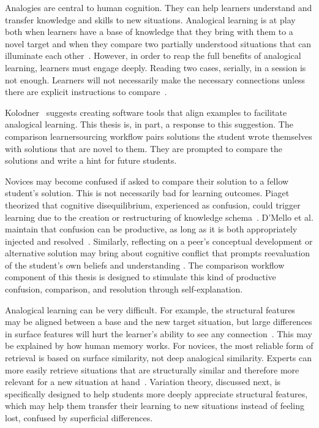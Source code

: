 Analogies are central to human cognition. They can help learners understand and transfer knowledge and skills to new situations. Analogical learning is at play both when learners have a base of knowledge that they bring with them to a novel target and when they compare two partially understood situations that can illuminate each other~\cite{kurtz01learning,loewenstein2003analogical}. However, in order to reap the full benefits of analogical learning, learners must engage deeply. Reading two cases, serially, in a session is not enough. Learners will not necessarily make the necessary connections unless there are explicit instructions to compare~\cite{loewenstein2003analogical,catrambone1989overcoming}. 

Kolodner~\cite{Kolodner} suggests creating software tools that align examples to facilitate analogical learning. This thesis is, in part, a response to this suggestion. The comparison learnersourcing workflow pairs solutions the student wrote themselves with solutions that are novel to them. They are prompted to compare the solutions and write a hint for future students.

Novices may become confused if asked to compare their solution to a fellow student's solution. This is not necessarily bad for learning outcomes. Piaget theorized that cognitive disequilibrium, experienced as confusion, could trigger learning due to the creation or restructuring of knowledge schema~\cite{disequilibrium}. D'Mello et al. maintain that confusion can be productive, as long as it is both appropriately injected and resolved~\cite{productiveconfusion}. Similarly, reflecting on a peer's conceptual development or alternative solution may bring about cognitive conflict that prompts reevaluation of the student's own beliefs and understanding \cite{kavanagh}. The comparison workflow component of this thesis is designed to stimulate this kind of productive confusion, comparison, and resolution through self-explanation. 

Analogical learning can be very difficult. For example, the structural features may be aligned between a base and the new target situation, but large differences in surface features will hurt the learner's ability to see any connection~\cite{Kurtz}. This may be explained by how human memory works. For novices, the most reliable form of retrieval is based on surface similarity, not deep analogical similarity. Experts can more easily retrieve situations that are structurally similar and therefore more relevant for a new situation at hand~\cite{Loewenstein}. Variation theory, discussed next, is specifically designed to help students more deeply appreciate structural features, which may help them transfer their learning to new situations instead of feeling lost, confused by superficial differences.

